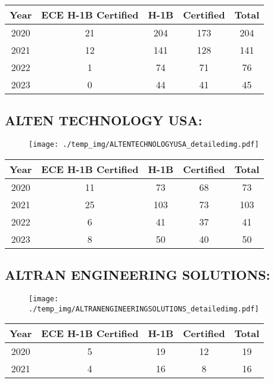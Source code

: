 \documentclass{article}%
\begin{document}
%
\begin{longtable}{c|c|c|c|c}%
\hline%
Year&ECE H{-}1B Certified&H{-}1B&Certified&Total\\%
\hline%
2020&21&204&173&204\\%
\hline%
2021&12&141&128&141\\%
\hline%
2022&1&74&71&76\\%
\hline%
2023&0&44&41&45\\%
\hline%
\end{longtable}

%
\newpage%
\subsection{ALTEN TECHNOLOGY USA:}%
\label{subsec:ALTENTECHNOLOGYUSA}%
\label{ALTENTECHNOLOGYUSAdetailed}%


\begin{figure}[htbp]%
\centering%
\texttt{[image: ./temp\_img/ALTENTECHNOLOGYUSA\_detailedimg.pdf]}%
\end{figure}

%
\begin{longtable}{c|c|c|c|c}%
\hline%
Year&ECE H{-}1B Certified&H{-}1B&Certified&Total\\%
\hline%
2020&11&73&68&73\\%
\hline%
2021&25&103&73&103\\%
\hline%
2022&6&41&37&41\\%
\hline%
2023&8&50&40&50\\%
\hline%
\end{longtable}

%
\newpage%
\subsection{ALTRAN ENGINEERING SOLUTIONS:}%
\label{subsec:ALTRANENGINEERINGSOLUTIONS}%
\label{ALTRANENGINEERINGSOLUTIONSdetailed}%


\begin{figure}[htbp]%
\centering%
\texttt{[image: ./temp\_img/ALTRANENGINEERINGSOLUTIONS\_detailedimg.pdf]}%
\end{figure}

%
\begin{longtable}{c|c|c|c|c}%
\hline%
Year&ECE H{-}1B Certified&H{-}1B&Certified&Total\\%
\hline%
2020&5&19&12&19\\%
\hline%
2021&4&16&8&16\\%
\hline%
\end{longtable}
\end{document}
